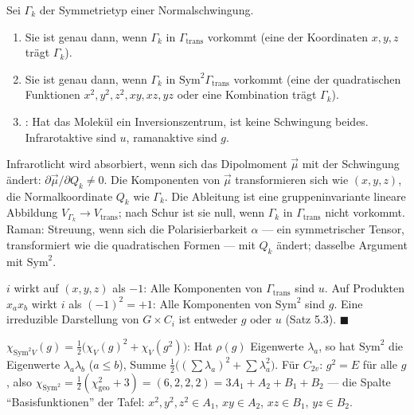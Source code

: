 \begin{merksatz}
Sei $\Gamma_k$ der Symmetrietyp einer Normalschwingung.
\begin{enumerate}[label=(\alph*), leftmargin=1.6em]
\item Sie ist  genau dann, wenn $\Gamma_k$ in $\Gamma_{\mathrm{trans}}$ vorkommt (eine der Koordinaten $x, y, z$ trägt $\Gamma_k$).
\item Sie ist  genau dann, wenn $\Gamma_k$ in $\mathrm{Sym}^{2}\Gamma_{\mathrm{trans}}$ vorkommt (eine der quadratischen Funktionen $x^{2}, y^{2}, z^{2}, xy, xz, yz$ oder eine Kombination trägt $\Gamma_k$).
\item {}: Hat das Molekül ein Inversionszentrum, ist keine Schwingung beides. Infrarotaktive sind $u$, ramanaktive sind $g$.
\end{enumerate}

Infrarotlicht wird absorbiert, wenn sich das Dipolmoment $\vec\mu$ mit der Schwingung ändert: $\partial\vec\mu/\partial Q_k\neq0$. Die Komponenten von $\vec\mu$ transformieren sich wie $(x, y, z)$, die Normalkoordinate $Q_k$ wie $\Gamma_k$. Die Ableitung ist eine gruppeninvariante lineare Abbildung $V_{\Gamma_k}\to V_{\mathrm{trans}}$; nach Schur ist sie null, wenn $\Gamma_k$ in $\Gamma_{\mathrm{trans}}$ nicht vorkommt. Raman: Streuung, wenn sich die Polarisierbarkeit $\alpha$ --- ein symmetrischer Tensor, transformiert wie die quadratischen Formen --- mit $Q_k$ ändert; dasselbe Argument mit $\mathrm{Sym}^{2}$.

$i$ wirkt auf $(x, y, z)$ als $-1$: Alle Komponenten von $\Gamma_{\mathrm{trans}}$ sind $u$. Auf Produkten $x_ax_b$ wirkt $i$ als $(-1)^{2} = +1$: Alle Komponenten von $\mathrm{Sym}^{2}$ sind $g$. Eine irreduzible Darstellung von $G\times C_i$ ist entweder $g$ oder $u$ (Satz 5.3). $\blacksquare$

$\chi_{\mathrm{Sym}^{2}V}(g) = \frac12\bigl(\chi_V(g)^{2} + \chi_V(g^{2})\bigr)$: Hat $\rho(g)$ Eigenwerte $\lambda_a$, so hat $\mathrm{Sym}^{2}$ die Eigenwerte $\lambda_a\lambda_b$ ($a\le b$), Summe $\frac12\bigl((\sum\lambda_a)^{2} + \sum\lambda_a^{2}\bigr)$. Für $C_{2v}$: $g^{2} = E$ für alle $g$, also $\chi_{\mathrm{Sym}^{2}} = \frac12(\chi_{\mathrm{geo}}^{2} + 3) = (6, 2, 2, 2) = 3A_1 + A_2 + B_1 + B_2$ --- die Spalte \enquote{Basisfunktionen} der Tafel: $x^{2}, y^{2}, z^{2}\in A_1$, $xy\in A_2$, $xz\in B_1$, $yz\in B_2$. \checkmark


\end{merksatz}

